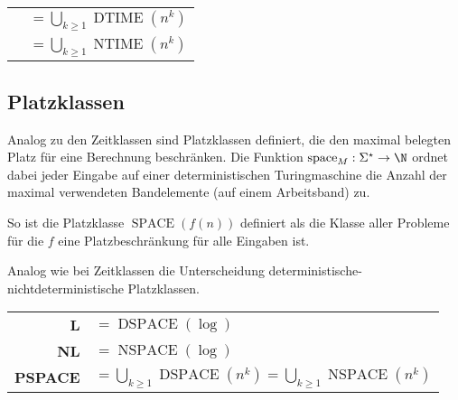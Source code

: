 \begin{center}
	\renewcommand{\arraystretch}{2}
	\begin{tabular}{rl}
		\poly&$=\displaystyle\bigcup_{k\geq 1} \operatorname{DTIME}(n^k)$\\
		\npoly&$=\displaystyle\bigcup_{k\geq 1} \operatorname{NTIME}(n^k)$
	\end{tabular}
\end{center}

\subsection{Platzklassen}
Analog zu den Zeitklassen sind Platzklassen definiert, die den maximal belegten Platz für eine Berechnung beschränken. Die Funktion $\mathrm{space}_M:\Sigma^\star\rightarrow \N$ ordnet dabei jeder Eingabe auf einer deterministischen Turingmaschine die Anzahl der maximal verwendeten Bandelemente (auf einem Arbeitsband) zu.

So ist die Platzklasse $\operatorname{SPACE}(f(n))$ definiert als die Klasse aller Probleme für die $f$ eine Platzbeschränkung für alle Eingaben ist.

Analog wie bei Zeitklassen die Unterscheidung deterministische-nichtdeterministische Platzklassen.
\begin{center}
	\renewcommand{\arraystretch}{2}
	\begin{tabular}{rl}
		\textbf{L}&$=\operatorname{DSPACE}(\log)$\\
		\textbf{NL}&$=\operatorname{NSPACE}(\log)$\\
		\textbf{PSPACE}&$=\displaystyle\bigcup_{k\geq 1} \operatorname{DSPACE}(n^k)=\bigcup_{k\geq 1} \operatorname{NSPACE}(n^k)$
	\end{tabular}
\end{center}

